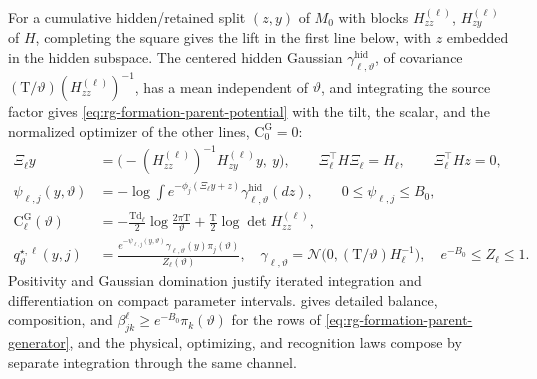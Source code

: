 For a cumulative hidden/retained split \((z,y)\) of \(M_0\) with blocks
\(H^{(\ell)}_{zz}\), \(H^{(\ell)}_{zy}\) of \(H\), completing the square gives
the lift in the first line below, with \(z\) embedded in the hidden subspace.
The centered hidden Gaussian \(\gamma^{\mathrm{hid}}_{\ell,\vartheta}\), of
covariance \((\mathrm T/\vartheta)(H^{(\ell)}_{zz})^{-1}\), has a mean
independent of \(\vartheta\), and integrating the source factor gives
\cref{eq:rg-formation-parent-potential} with the tilt, the scalar, and the
normalized optimizer of the other lines, \(\mathrm C_0^{\mathrm G}=0\):
\begin{align}
 \Xi_\ell y&=\bigl(-(H^{(\ell)}_{zz})^{-1}H^{(\ell)}_{zy}y,\ y\bigr),\qquad
 \Xi_\ell^\top H\Xi_\ell=H_\ell,\qquad \Xi_\ell^\top Hz=0,
 \label{eq:rg-formation-gaussian-lift}\\
 \psi_{\ell,j}(y,\vartheta)
 &=-\log\int e^{-\phi_j(\Xi_\ell y+z)}
                  \gamma^{\mathrm{hid}}_{\ell,\vartheta}(dz),
 \qquad 0\le\psi_{\ell,j}\le B_0,
 \label{eq:rg-formation-parent-tilt-proof}\\
 \mathrm C_\ell^{\mathrm G}(\vartheta)
 &=-\frac{\mathrm T\mathrm d_\ell}{2}\log\frac{2\pi\mathrm T}{\vartheta}
       +\frac{\mathrm T}2\log\det H^{(\ell)}_{zz},
 \label{eq:rg-formation-hidden-scalar-proof}\\
 q^{\star,\ell}_\vartheta(y,j)
 &=\frac{e^{-\psi_{\ell,j}(y,\vartheta)}
       \gamma_{\ell,\vartheta}(y)\pi_j(\vartheta)}{Z_\ell(\vartheta)},\quad
 \gamma_{\ell,\vartheta}=\mathcal N\bigl(0,(\mathrm T/\vartheta)H_\ell^{-1}\bigr),\quad
 e^{-B_0}\le Z_\ell\le1.
 \label{eq:rg-formation-normalized-parent-proof}
\end{align}
Positivity and Gaussian domination justify iterated integration and
differentiation on compact parameter intervals.
 gives detailed balance, composition,
and \(\beta^\ell_{jk}\ge e^{-B_0}\pi_k(\vartheta)\) for the rows of
\cref{eq:rg-formation-parent-generator}, and the physical, optimizing, and
recognition laws compose by separate integration through the same channel.


